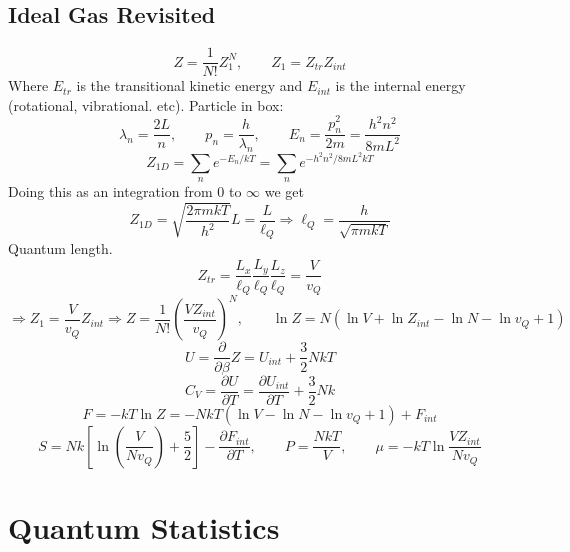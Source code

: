 \documentclass[a4paper,norsk, 10pt]{article}
\begin{document}
\subsection{Ideal Gas Revisited}
\begin{equation}
Z =\frac{1}{N!} Z_1^N, \qquad Z_1 = Z_{tr}Z_{int}
\end{equation}
Where $E_{tr}$ is the transitional kinetic energy and $E_{int}$ is the internal energy (rotational, vibrational. etc). Particle in box:
\begin{equation}
\lambda_n = \frac{2L}{n}, \qquad p_n = \frac{h}{\lambda_n},\qquad E_n = \frac{p_n^2}{2m} = \frac{h^2n^2}{8mL^2}
\end{equation}
\begin{equation}
Z_{1D} = \sum_ne^{-E_n/kT} = \sum_n e^{-h^2n^2/8mL^2kT}
\end{equation}
Doing this as an integration from $0$ to $\infty$ we get
\begin{equation}
Z_{1D} = \sqrt{\frac{2\pi mk T}{h^2}}L = \frac{L}{\ell_Q} \Rightarrow \ell_Q = \frac{h}{\sqrt{\pi mkT}} 
\end{equation}
Quantum length.
\begin{equation}
Z_{tr} = \frac{L_x}{\ell_Q}\frac{L_y}{\ell_Q}\frac{L_z}{\ell_Q} = \frac{V}{v_Q}
\end{equation}
\begin{equation}
\Rightarrow Z_1 = \frac{V}{v_Q}Z_{int}\Rightarrow Z = \frac{1}{N!}\left(\frac{VZ_{int}}{v_Q}\right)^N,\qquad \ln Z = N( \ln V + \ln Z_{int} - \ln N - \ln v_Q + 1)
\end{equation}
\begin{equation}
U = \frac{\partial}{\partial \beta} Z =  U_{int} + \frac{3}{2}NkT 
\end{equation}
\begin{equation}
C_V = \frac{\partial U}{\partial T} = \frac{\partial U_{int}}{\partial T} + \frac{3}{2}Nk
\end{equation}
\begin{equation}
F = -kT\ln Z = -NkT(\ln V - \ln N - \ln v_Q + 1) + F_{int}
\end{equation}
\begin{equation}
S = Nk\left[\ln \left(\frac{V}{Nv_Q}\right) + \frac{5}{2}\right] - \frac{\partial F_{int}}{\partial T}, \qquad P = \frac{NkT}{V},\qquad \mu = -kT\ln \frac{V Z_{int}}{Nv_Q}
\end{equation}
\section{Quantum Statistics}
\end{document}
